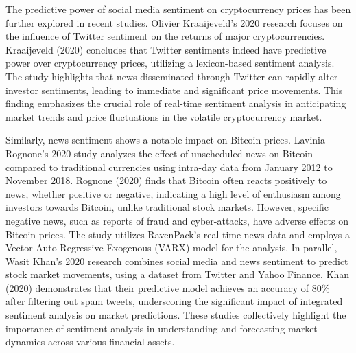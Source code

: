 The predictive power of social media sentiment on cryptocurrency prices has been further explored in recent studies. Olivier Kraaijeveld's 2020 research focuses on the influence of Twitter sentiment on the returns of major cryptocurrencies. Kraaijeveld (2020) concludes that Twitter sentiments indeed have predictive power over cryptocurrency prices, utilizing a lexicon-based sentiment analysis. The study highlights that news disseminated through Twitter can rapidly alter investor sentiments, leading to immediate and significant price movements. This finding emphasizes the crucial role of real-time sentiment analysis in anticipating market trends and price fluctuations in the volatile cryptocurrency market.

Similarly, news sentiment shows a notable impact on Bitcoin prices. Lavinia Rognone's 2020 study analyzes the effect of unscheduled news on Bitcoin compared to traditional currencies using intra-day data from January 2012 to November 2018. Rognone (2020) finds that Bitcoin often reacts positively to news, whether positive or negative, indicating a high level of enthusiasm among investors towards Bitcoin, unlike traditional stock markets. However, specific negative news, such as reports of fraud and cyber-attacks, have adverse effects on Bitcoin prices. The study utilizes RavenPack's real-time news data and employs a Vector Auto-Regressive Exogenous (VARX) model for the analysis. In parallel, Wasit Khan's 2020 research combines social media and news sentiment to predict stock market movements, using a dataset from Twitter and Yahoo Finance. Khan (2020) demonstrates that their predictive model achieves an accuracy of 80\% after filtering out spam tweets, underscoring the significant impact of integrated sentiment analysis on market predictions. These studies collectively highlight the importance of sentiment analysis in understanding and forecasting market dynamics across various financial assets.

